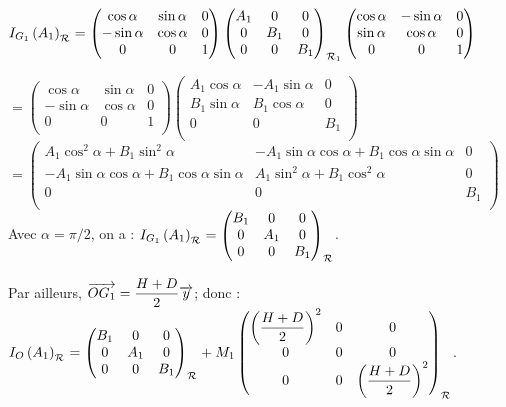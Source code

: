 \documentclass[10pt,fleqn]{article} %
\begin{document}
\begin{multicols}{2}
\begin{corrige}
$\inertie{G_1}{A_1}_{\rep{}}=
\begin{pmatrix} \cos \alpha & \sin\alpha & 0 \\-\sin \alpha & \cos \alpha & 0 \\ 0 & 0 & 1 \\ \end{pmatrix}
\matinertie{A_1}{B_1}{B_1}{0}{0}{0}{\rep{1}}
\begin{pmatrix} \cos \alpha & - \sin\alpha & 0 \\ \sin \alpha & \cos \alpha & 0 \\ 0 & 0 & 1 \\ \end{pmatrix}
$

$=
\begin{pmatrix} \cos \alpha & \sin\alpha & 0 \\-\sin \alpha & \cos \alpha & 0 \\ 0 & 0 & 1 \\ \end{pmatrix}
\begin{pmatrix}A_1 \cos \alpha & -A_1 \sin\alpha & 0 \\ B_1\sin \alpha & B_1\cos \alpha & 0 \\ 0 & 0 & B_1 \\ \end{pmatrix}
$
$=
\begin{pmatrix}
A_1 \cos^2\alpha +B_1 \sin^2\alpha& -A_1 \sin\alpha\cos\alpha+B_1\cos\alpha\sin\alpha & 0 \\ 
-A_1\sin \alpha\cos\alpha+B_1\cos\alpha\sin\alpha  &A_1\sin^2\alpha+ B_1\cos^2 \alpha & 0 \\ 0 & 0 & B_1 \\ \end{pmatrix}
$
Avec $\alpha=\pi/2$, 
on a : $\inertie{G_1}{A_1}_{\rep{}}=\begin{pmatrix}
B_1 &0 & 0 \\ 
0 & A_1 & 0 \\
 0 & 0 & B_1 \\\end{pmatrix}_{\rep{}}
$.


Par ailleurs, $\vect{OG_1}=\dfrac{H+D}{2}\vect{y}$; donc :
  $\inertie{O}{A_1}_{\rep{}}=\matinertie{B_1}{A_1}{B_1}{0}{0}{0}{\rep{}}+M_1\begin{pmatrix}
\left( \dfrac{H+D}{2}\right)^2 &0 & 0 \\ 
0 & 0& 0 \\
 0 & 0 & \left( \dfrac{H+D}{2}\right)^2 \\\end{pmatrix}_{\rep{}}$.
 

\end{corrige}
\end{multicols}
\end{document}
